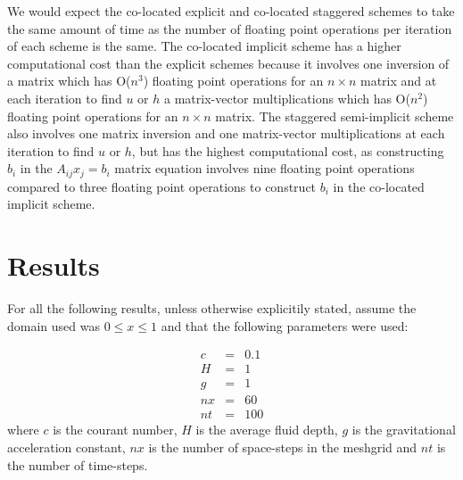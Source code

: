 \documentclass[a4paper,12pt, notitlepage]{article}
\begin{document}
We would expect the co-located explicit and co-located staggered schemes to take the same amount of time as the number of floating point operations per iteration of each scheme is the same. The co-located implicit scheme has a higher computational cost than the explicit schemes because it involves one inversion of a matrix which has O($n^{3}$) floating point operations for an $n \times n$ matrix and at each iteration to find $u$ or $h$ a matrix-vector multiplications which has O($n^{2}$) floating point operations for an $n \times n$ matrix. The staggered semi-implicit scheme also involves one matrix inversion and one matrix-vector multiplications at each iteration to find $u$ or $h$, but has the highest computational cost, as constructing $b_{i}$ in the $A_{ij}x_{j} = b_{i}$ matrix equation involves nine floating point operations compared to three floating point operations to construct $b_{i}$ in the co-located implicit scheme.

\section{Results}\label{results section}
For all the following results, unless otherwise explicitily stated, assume the domain used was $0 \leq x \leq 1$ and that the following parameters were used:

\begin{eqnarray}
c & = & 0.1\\
H & = & 1\\
g & = & 1\\
nx & = & 60\\
nt & = & 100
\end{eqnarray}
where $c$ is the courant number, $H$ is the average fluid depth, $g$ is the gravitational acceleration constant, $nx$ is the number of space-steps in the meshgrid and $nt$ is the number of time-steps.
\end{document}
